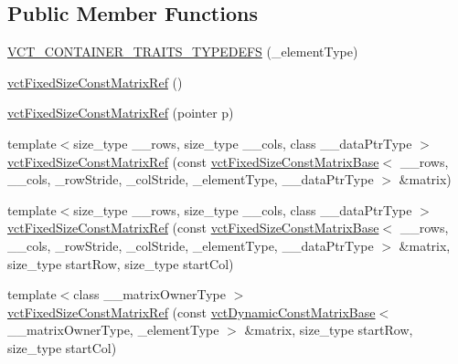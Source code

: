 \subsection*{Public Member Functions}
\begin{DoxyCompactItemize}
\item 
\hyperlink{classvct_fixed_size_const_matrix_ref_adaec9dc80ea835e3e382a4f9f73b6777}{V\-C\-T\-\_\-\-C\-O\-N\-T\-A\-I\-N\-E\-R\-\_\-\-T\-R\-A\-I\-T\-S\-\_\-\-T\-Y\-P\-E\-D\-E\-F\-S} (\-\_\-element\-Type)
\item 
\hyperlink{classvct_fixed_size_const_matrix_ref_a9b153cd096b48fbc69f2637a417bb382}{vct\-Fixed\-Size\-Const\-Matrix\-Ref} ()
\item 
\hyperlink{classvct_fixed_size_const_matrix_ref_af5338576a3658d1f256ed94bd7911a40}{vct\-Fixed\-Size\-Const\-Matrix\-Ref} (pointer p)
\item 
{\footnotesize template$<$size\-\_\-type \-\_\-\-\_\-rows, size\-\_\-type \-\_\-\-\_\-cols, class \-\_\-\-\_\-data\-Ptr\-Type $>$ }\\\hyperlink{classvct_fixed_size_const_matrix_ref_a3f3349e007ef22fb9efb62a6e2d227a6}{vct\-Fixed\-Size\-Const\-Matrix\-Ref} (const \hyperlink{classvct_fixed_size_const_matrix_base}{vct\-Fixed\-Size\-Const\-Matrix\-Base}$<$ \-\_\-\-\_\-rows, \-\_\-\-\_\-cols, \-\_\-row\-Stride, \-\_\-col\-Stride, \-\_\-element\-Type, \-\_\-\-\_\-data\-Ptr\-Type $>$ \&matrix)
\item 
{\footnotesize template$<$size\-\_\-type \-\_\-\-\_\-rows, size\-\_\-type \-\_\-\-\_\-cols, class \-\_\-\-\_\-data\-Ptr\-Type $>$ }\\\hyperlink{classvct_fixed_size_const_matrix_ref_aaf877bbc0f9ffda9ea5345ee97ff9dd9}{vct\-Fixed\-Size\-Const\-Matrix\-Ref} (const \hyperlink{classvct_fixed_size_const_matrix_base}{vct\-Fixed\-Size\-Const\-Matrix\-Base}$<$ \-\_\-\-\_\-rows, \-\_\-\-\_\-cols, \-\_\-row\-Stride, \-\_\-col\-Stride, \-\_\-element\-Type, \-\_\-\-\_\-data\-Ptr\-Type $>$ \&matrix, size\-\_\-type start\-Row, size\-\_\-type start\-Col)
\item 
{\footnotesize template$<$class \-\_\-\-\_\-matrix\-Owner\-Type $>$ }\\\hyperlink{classvct_fixed_size_const_matrix_ref_aada94bfe3741046a6e937e2635bda0b7}{vct\-Fixed\-Size\-Const\-Matrix\-Ref} (const \hyperlink{classvct_dynamic_const_matrix_base}{vct\-Dynamic\-Const\-Matrix\-Base}$<$ \-\_\-\-\_\-matrix\-Owner\-Type, \-\_\-element\-Type $>$ \&matrix, size\-\_\-type start\-Row, size\-\_\-type start\-Col)
\item 

\end{DoxyCompactItemize}
